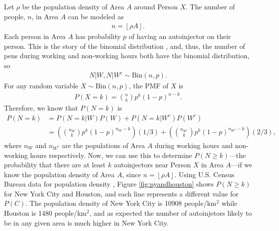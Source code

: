 Let $\rho$ be the population density of Area $A$ around Person $X$. The number of people, $n$, in Area $A$ can be modeled as
\begin{align*}
    n = \left\lfloor\rho A \right\rfloor.
\end{align*}
Each person in Area $A$ has probability $p$ of having an autoinjector on their person. This is the story of the binomial distribution \cite{blitz}, and, thus, the number of pens during working and non-working hours both have the binomial distribution, so
\begin{align*}
    N|W,N|W^c \sim \text{Bin}(n,p).
\end{align*}
For any random variable $X \sim \text{Bin}(n,p)$, the PMF of $X$ is
\begin{align*}
    P(X=k) = \binom{n}{k}p^k(1-p)^{n-k}.
\end{align*}
Therefore, we know that $P(N=k)$ is
\begin{align*}
    P(N=k) &= P(N=k|W)P(W) + P(N=k|W^c)P(W^c) \\
    &= \left(\binom{n_W}{k}p^k(1-p)^{n_W-k}\right)\left(1/3\right) + \left(\binom{n_{W^c}}{k}p^k(1-p)^{n_{W^c}-k}\right)\left(2/3\right),
\end{align*}
where $n_W$ and $n_{W^c}$ are the populations of Area $A$ during working hours and non-working hours respectively. Now, we can use this to determine $P(N\geq k)$---the probability that there are at least $k$ autoinjectors near Person $X$ in Area $A$---if we know the population density of Area $A$, since $n=\left\lfloor \rho A \right\rfloor$. Using U.S. Census Bureau data for population density \cite{acs}, Figure \ref{fig:nyandhouston} shows $P(N \geq k)$ for New York City and Houston, and each line represents a different value for $P(C)$. The population density of New York City is 10908 people/km$^2$ while Houston is 1480 people/km$^2$, and as expected the number of autoinjetors likely to be in any given area is much higher in New York City.

